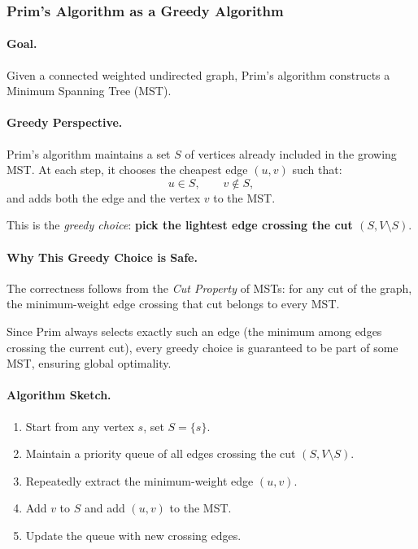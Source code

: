 \documentclass[9pt]{extarticle}
\begin{document}
\subsubsection{Prim’s Algorithm as a Greedy Algorithm}

\paragraph{Goal.}
Given a connected weighted undirected graph, Prim’s algorithm constructs a Minimum Spanning Tree (MST).

\paragraph{Greedy Perspective.}
Prim’s algorithm maintains a set \(S\) of vertices already included in the growing MST. At each step, it chooses the cheapest edge \((u,v)\) such that:
\[
u \in S, \qquad v \notin S,
\]
and adds both the edge and the vertex \(v\) to the MST.

This is the \emph{greedy choice}:  
\textbf{pick the lightest edge crossing the cut \((S, V\setminus S)\)}.

\paragraph{Why This Greedy Choice is Safe.}
The correctness follows from the \emph{Cut Property} of MSTs:  
for any cut of the graph, the minimum-weight edge crossing that cut belongs to every MST.

Since Prim always selects exactly such an edge (the minimum among edges crossing the current cut), every greedy choice is guaranteed to be part of some MST, ensuring global optimality.

\paragraph{Algorithm Sketch.}
\begin{enumerate}
    \item Start from any vertex \(s\), set \(S = \{s\}\).
    \item Maintain a priority queue of all edges crossing the cut \((S,V\setminus S)\).
    \item Repeatedly extract the minimum-weight edge \((u,v)\).
    \item Add \(v\) to \(S\) and add \((u,v)\) to the MST.
    \item Update the queue with new crossing edges.
\end{enumerate}
\end{document}
